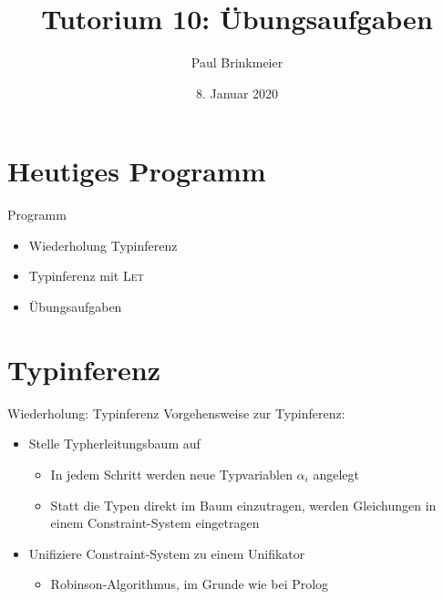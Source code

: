 \documentclass{beamer}
\title{Tutorium 10: Übungsaufgaben}
\author{Paul Brinkmeier}
\institute{Tutorium Programmierparadigmen am KIT}
\date{8. Januar 2020}
\begin{document}
\begin{frame}
	\titlepage
\end{frame}

\section{Heutiges Programm}

\begin{frame}{Programm}
	\begin{itemize}
		\item Wiederholung Typinferenz
		\item Typinferenz mit \textsc{Let}
		\item Übungsaufgaben
	\end{itemize}
\end{frame}

\section{Typinferenz}

\newcommand{\aeq}{\stackrel{\alpha}{=}}
\newcommand{\naeq}{\stackrel{\alpha}{\neq}}
\newcommand{\eeq}{\stackrel{\eta}{=}}

\newcommand{\E}{\;}

\newcommand{\liin}[2]{#1\E{}#2}
\newcommand{\liiin}[3]{#1\E{}#2\E{}#3}
\newcommand{\livn}[4]{#1\E{}#2\E{}#3\E{}#4}
\newcommand{\lvn}[5]{#1\E{}#2\E{}#3\E{}#4\E{}#5}

\newcommand{\lii}[2]{(#1\E{}#2)}
\newcommand{\liii}[3]{(#1\E{}#2\E{}#3)}

\newcommand{\liir}[2]{\textcolor{red}{\underline{(}}#1\E{}#2\textcolor{red}{\underline{)}}}
\newcommand{\liiir}[3]{\textcolor{red}{\underline{(}}#1\E{}#2\E{}#3\textcolor{red}{\underline{)}}}

\newcommand{\subst}[3]{(#1)\left[#2\,\to\,#3\right]}
\newcommand{\abs}[2]{\lambda{}#1.#2}
\newcommand{\reducesTo}[1]{\stackrel{#1}{\implies}}
\newcommand{\tikzmark}[3]{\tikz[baseline, remember picture]{
	\node[fill=#1,draw] (#2) {#3};
}}

\newcommand{\typeRule}[3]{\frac{#2}{#3} \textrm{\textsc{#1}}}

\begin{frame}{Wiederholung: Typinferenz}
	Vorgehensweise zur Typinferenz:
	\begin{itemize}
		\item Stelle Typherleitungsbaum auf
		\begin{itemize}
			\item In jedem Schritt werden neue Typvariablen $\alpha_i$ angelegt
			\item Statt die Typen direkt im Baum einzutragen, werden Gleichungen in einem Constraint-System eingetragen
		\end{itemize}
		\item Unifiziere Constraint-System zu einem Unifikator
		\begin{itemize}
			\item Robinson-Algorithmus, im Grunde wie bei Prolog
		\end{itemize}
	\end{itemize}
\end{frame}
\end{document}

